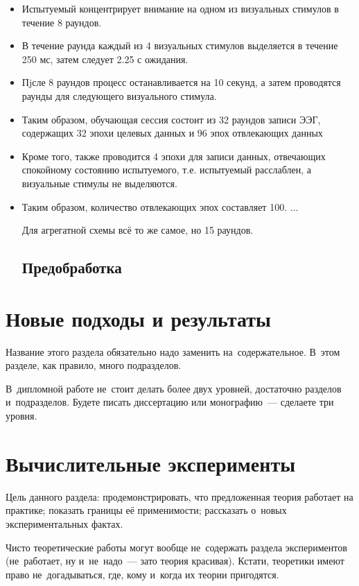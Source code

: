 \documentclass[12pt,fleqn]{article}
\begin{document}
	\begin{itemize} 
	\item
	Испытуемый концентрирует внимание на одном из визуальных стимулов в течение 8 раундов.
	\item
	В течение раунда каждый из 4 визуальных стимулов выделяется в течение 250 мс, затем следует 2.25 с ожидания.
	\item
	Пjсле 8 раундов процесс останавливается на 10 секунд, а затем проводятся раунды для следующего визуального стимула.
	\item
	Таким образом, обучающая сессия состоит из 32 раундов записи ЭЭГ, содержащих 32 эпохи целевых данных и 96 эпох отвлекающих данных
	\item
	Кроме того, также проводится 4 эпохи для записи данных, отвечающих спокойному состоянию испытуемого, т.е. испытуемый расслаблен, а визуальные стимулы не выделяются.
	\item
	Таким образом, количество отвлекающих эпох составляет 100. ...
	\par Для агрегатной схемы всё то же самое, но 15 раундов.
	
\subsection{Предобработка}
	
	\end{itemize}
\newpage
\section{Новые подходы и результаты}

Название этого раздела обязательно надо заменить на~содержательное. 
В~этом разделе, как правило, много подразделов. 

В~дипломной работе не~стоит делать более двух уровней,
достаточно разделов и~подразделов.
Будете писать диссертацию или монографию~--- сделаете три уровня. 
  
\section{Вычислительные эксперименты}

Цель данного раздела:
продемонстрировать, что предложенная теория работает на практике;
показать границы её применимости;
рассказать о~новых экспериментальных фактах.

Чисто теоретические работы могут вообще не~содержать раздела экспериментов
(не~работает, ну и~не~надо~--- зато теория красивая).
Кстати, теоретики имеют право не~догадываться, где, кому и~когда их теории пригодятся.
\end{document}
